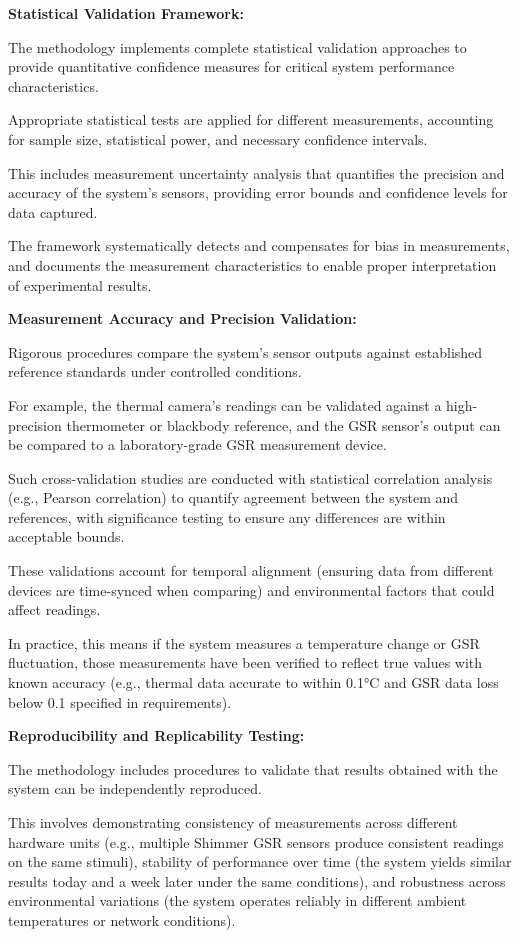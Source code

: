 \textbf{Statistical Validation Framework:}

The methodology implements complete statistical validation approaches to provide
quantitative confidence measures for critical system performance characteristics.

Appropriate statistical tests are applied for different measurements, accounting for
sample size, statistical power, and necessary confidence intervals.

This includes measurement uncertainty analysis that quantifies the precision and
accuracy of the system's sensors, providing error bounds and confidence levels for
data captured.

The framework systematically detects and compensates for bias in measurements, and
documents the measurement characteristics to enable proper interpretation of
experimental results.

\textbf{Measurement Accuracy and Precision Validation:}

Rigorous procedures compare the system's sensor outputs against established reference
standards under controlled conditions.

For example, the thermal camera's readings can be validated against a high-precision
thermometer or blackbody reference, and the GSR sensor's output can be compared to a
laboratory-grade GSR measurement device.

Such cross-validation studies are conducted with statistical correlation analysis
(e.g., Pearson correlation) to quantify agreement between the system and references,
with significance testing to ensure any differences are within acceptable bounds.

These validations account for temporal alignment (ensuring data from different
devices are time-synced when comparing) and environmental factors that could affect
readings.

In practice, this means if the system measures a temperature change or GSR
fluctuation, those measurements have been verified to reflect true values with known
accuracy (e.g., thermal data accurate to within 0.1°C and GSR data loss below 0.1%
specified in requirements).

\textbf{Reproducibility and Replicability Testing:}

The methodology includes procedures to validate that results obtained with the system
can be independently reproduced.

This involves demonstrating consistency of measurements across different hardware
units (e.g., multiple Shimmer GSR sensors produce consistent readings on the same
stimuli), stability of performance over time (the system yields similar results today
and a week later under the same conditions), and robustness across environmental
variations (the system operates reliably in different ambient temperatures or network
conditions).

